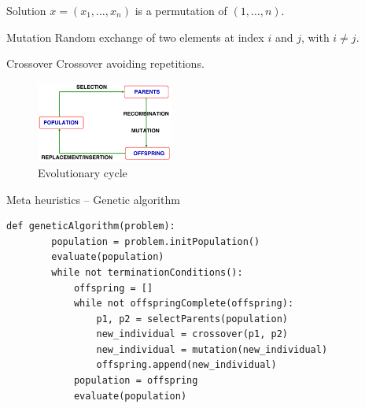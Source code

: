 \begin{example}
    Solution $x = (x_1, \dots, x_n)$ is a permutation of $(1, \dots, n)$.
    \begin{descriptionlist}
        \item[Mutation] Random exchange of two elements at index $i$ and $j$, with $i \neq j$.
        \item[Crossover] Crossover avoiding repetitions.
    \end{descriptionlist}
\end{example}

\begin{figure}[H]
    \centering
    \includegraphics[width=0.4\textwidth]{img/_genetic_cycle.pdf}
    \caption{Evolutionary cycle}
\end{figure}

\begin{algorithm}
\caption{Meta heuristics -- Genetic algorithm}
\begin{lstlisting}[mathescape=true]
    def geneticAlgorithm(problem):
        population = problem.initPopulation()
        evaluate(population)
        while not terminationConditions():
            offspring = []
            while not offspringComplete(offspring):
                p1, p2 = selectParents(population)
                new_individual = crossover(p1, p2)
                new_individual = mutation(new_individual)
                offspring.append(new_individual)
            population = offspring
            evaluate(population)
\end{lstlisting}
\end{algorithm}
